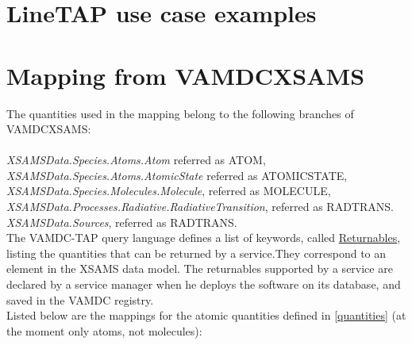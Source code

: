 \documentclass[11pt,a4paper]{ivoa}
\begin{document}


\section{LineTAP use case examples}


\section{Mapping from VAMDCXSAMS}

The quantities used in the mapping belong to the following branches of VAMDCXSAMS:\\\\
\textit{XSAMSData.Species.Atoms.Atom}  referred as ATOM,\\
\textit{XSAMSData.Species.Atoms.AtomicState}  referred as ATOMICSTATE,\\
\textit{XSAMSData.Species.Molecules.Molecule}, referred as MOLECULE,\\
\textit{XSAMSData.Processes.Radiative.RadiativeTransition}, referred as RADTRANS.\\
\textit{XSAMSData.Sources}, referred as RADTRANS.\\


The VAMDC-TAP query language defines a list of keywords, called \href{https://standards.vamdc.eu/dictionary/returnables.html}{Returnables}, listing the quantities that can be returned by a service.They correspond to an element in the XSAMS data model. The returnables supported by a service are declared by a service manager when he deploys the software on its database, and saved in the VAMDC registry. \\

Listed below are the mappings for the atomic quantities defined in \ref{quantities} (at the moment only atoms, not molecules):
\end{document}
